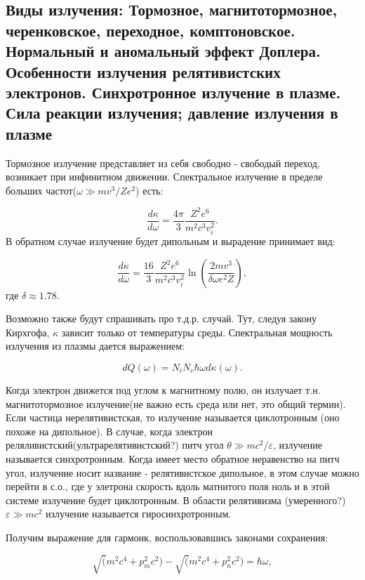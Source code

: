 \documentclass[10pt, a4paper]{article}
\begin{document}
\subsection{Виды излучения: Тормозное, магнитотормозное, черенковское, переходное, комптоновское. Нормальный и аномальный эффект Доплера. Особенности излучения релятивистских электронов. Синхротронное излучение в плазме. Сила реакции излучения; давление излучения в плазме}
Тормозное излучение представляет из себя свободно - свободый переход, возникает при инфинитном движении. 
Спектральное излучение в пределе больших частот($\omega \gg mv^3/Ze^2$) есть:

\begin{equation}
    \frac{d\kappa}{d\omega}=\frac{4\pi}{3}\frac{Z^2 e^6}{m^2 c^3 v_i^2}.
\end{equation}
В обратном случае излучение будет дипольным и вырадение принимает вид:

\begin{equation}
    \frac{d\kappa}{d\omega}=\frac{16}{3}\frac{Z^2 e^6}{m^2 c^3 v_i^2} \ln\left(\frac{2mv^3}{\delta \omega e^2 Z} \right),
\end{equation}
где $\delta \approx 1.78$.

Возможно также будут спрашивать про т.д.р. случай. Тут, следуя закону Кирхгофа, $\kappa$ зависит только от температуры среды. Спектральная мощность излучения из плазмы дается выражением:

\begin{equation}
    dQ(\omega)=N_i N_e \hbar \omega d\kappa(\omega).
\end{equation}

Когда электрон движется под углом к магнитному полю, он излучает т.н. магнитотормозное излучение(не важно есть среда или
нет, это общий термин). Если частица нерелятивистская, то излучение называется циклотронным (оно похоже на дипольное). В
случае, когда электрон реляливистский(ультрарелятивистский?) питч угол $\theta \gg mc^2/\varepsilon$, излучение
называется синхротронным. Когда имеет место обратное неравенство на питч угол, излучение носит название - релятивистское
дипольное, в этом случае можно перейти в с.о., где у элетрона скорость вдоль матнитого поля ноль и в этой системе
излучение будет циклотронным. В области релятивизма (умеренного?) $\varepsilon\gg mc^2$ излучение называется
гиросинхротронным.

Получим выражение для гармонк, воспользовавшись законами сохранения:

\begin{equation}
    \sqrt(m^2c^4+p_m^2c^2) - \sqrt(m^2c^4+p_n^2c^2)=\hbar \omega,
\end{equation}
\end{document}
